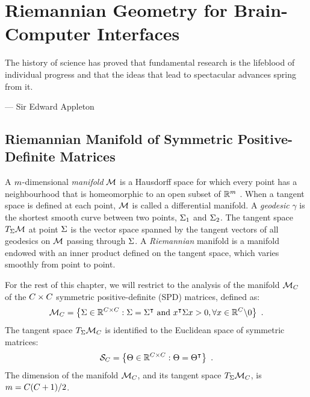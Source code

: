 
\chapter{Riemannian Geometry for Brain-Computer Interfaces}
\label{chap:riem-geom-bci}
\epigraph{The history of science has proved that fundamental research is the lifeblood of individual progress and that the ideas that lead to spectacular advances spring from it.}{--- \textup{Sir Edward Appleton}}

\section{Riemannian Manifold of Symmetric Positive-Definite Matrices}
\label{sec:riemann-manifold}

A $\totd$-dimensional \emph{manifold} $\GenMa$ is a Hausdorff space for which every point has a neighbourhood that is homeomorphic to an open subset of $\Re^\totd$ \citep{jost_riemannian_2011}.
When a tangent space is defined at each point, $\GenMa$ is called a differential manifold. 
A \emph{geodesic} $\gamma$ is the shortest smooth curve between two points, $\P_1$ and $\P_2$. 
The tangent space $T_\P\GenMa$ at point $\P$ is the vector space spanned by the tangent vectors of all geodesics on $\GenMa$ passing through $\P$. 
A \emph{Riemannian} manifold is a manifold endowed with an inner product defined on the tangent space, which varies smoothly from point to point.  %

For the rest of this chapter, we will restrict to the analysis of the manifold $\Ma$ of  the $\dc\times\dc$ symmetric positive-definite (SPD) matrices, defined as:
\begin{equation*}
	\label{eq:rm}
  \Ma = \left\{ \P \in  \Re^{\dc\times\dc} : \P = \P^\intercal \text{ and } x^\intercal \P x > 0, \forall x \in \Re^{\dc} \backslash 0 \right\} \ . %
\end{equation*}
The tangent space $T_{\P}\Ma$ is identified to the Euclidean space of symmetric matrices:
\begin{equation*}
  \label{eq:sy}
  \Sy = \left\{ \S \in \Re^{\dc\times\dc} : \S = \S^\intercal \right\} \ . %
\end{equation*}
The dimension of the manifold $\Ma$, and its tangent space $T_{\P}\Ma$, is $\totd = \dc(\dc+1)/2$.

